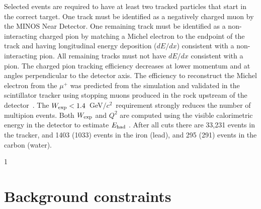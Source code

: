 \documentclass[aps,preprint,showpacs,superscriptaddress,letterpaper,showkeys,superscriptaddress,nofootinbib,floatfix]{revtex4-1}
\newcommand{\Wexp}{\ensuremath{W_{\rm\scriptstyle exp}}}
\newcommand{\Ehad}{\ensuremath{E_{\rm\scriptstyle had}}}
\newcommand{\gevcsq}{GeV$/c^2$}
\newcommand{\firstReviewAdd}[1]{{\bf\color{blue} \protect #1}}
\newcommand{\firstReviewStrike}[1]{{\bf\color{blue}\protect \sout{#1}}}
\newcommand{\firstReviewComment}[1]{{\noindent \bf\color{blue} \small [DAH: #1]}}
\newcommand{\secondReviewAdd}[1]{{\bf\color{purple} \protect #1}}
\newcommand{\firstRefereeAdd}[1]{{\bf\color{green} \protect #1}}
\newcommand{\firstRefereeStrike}[1]{{\bf\color{green}\protect \sout{#1}}}
\newcommand{\showSections}[0]{0}
\renewcommand{\firstReviewComment}[1]{}
\renewcommand{\firstReviewAdd}[1]{\protect #1}
\renewcommand{\firstReviewStrike}[1]{}
\renewcommand{\secondReviewAdd}[1]{\protect #1}
\renewcommand{\firstRefereeAdd}[1]{\protect #1}
\renewcommand{\firstRefereeStrike}[1]{}
\begin{document}
Selected event\firstRefereeAdd{s}\firstReviewStrike{in the analysis sample} are required to have at least two tracked particles that start in the correct target.  One track must be identified as a negatively charged muon by the MINOS Near Detector.  One \firstRefereeStrike{of the} remaining track\firstRefereeStrike{s} must be identified as a non-interacting charged pion by matching a Michel electron to the endpoint of the track and having longitudinal energy deposition ($dE/dx$) consistent with a non-interacting pion.  All \firstRefereeStrike{other} remaining tracks must not have \firstRefereeStrike{a} $dE/dx$ consistent with a pion.  
The charged pion tracking efficiency decreases at lower momentum and at angles perpendicular to the detector axis.  The efficiency to reconstruct the Michel electron from the $\mu^+$ was predicted from the simulation and \firstRefereeStrike{is} validated in the scintillator tracker \firstRefereeStrike{by studies of} \firstRefereeAdd{using} stopping muons produced \firstRefereeStrike{in neutrino interactions} in the \firstReviewAdd{rock upstream of the detector}~\cite{BercellieThesis}. 
The $\Wexp<1.4$~\gevcsq ~requirement strongly reduces the number of multipion events. Both $\Wexp$ and $Q^2$ are computed using the visible calorimetric energy in the detector to estimate $\Ehad$ \secondReviewAdd{\cite{BercellieThesis}}.  
\firstReviewAdd{After all cuts there are 33,231 events in the tracker, and 1403 (1033) events in the iron (lead), and 295 (291) events in the carbon (water).  }

\if\showSections1 \section{Background constraints} \fi
\end{document}
